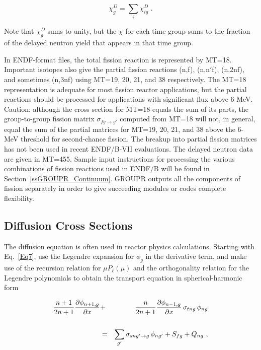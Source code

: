   \begin{equation}
    \chi_g^D=\sum_i\chi_{ig}^D\,\,.
  \end{equation}

\noindent
Note that $\chi_g^D$ sums to unity, but the $\chi$ for each time group
sums to the fraction of the delayed neutron yield that appears
in that time group.

In ENDF-format files, the total fission reaction is represented
by MT=18.  Important isotopes also give the partial fission reactions
 (n,f), (n,n$'$f), (n,2nf), and sometimes (n,3nf)
using MT=19, 20, 21, and 38 respectively.  The MT=18 representation is
adequate for most fission reactor applications, but the partial reactions
should be processed for applications with significant flux above 6 MeV.
Caution:  although the cross section for MT=18 equals the sum of its
parts, the group-to-group fission matrix $\sigma_{fg\rightarrow g'}$
computed from MT=18 will not, in general, equal the sum of the
partial matrices for MT=19, 20, 21, and 38 above the 6-MeV threshold
for second-chance fission.  The breakup into partial fission matrices
has not been used in recent ENDF/B-VII evaluations.  The
delayed neutron data are given in MT=455.  Sample input instructions
for processing the various combinations of fission reactions used
in ENDF/B will be found in Section~\ref{ssGROUPR_Continuum}.  GROUPR outputs all
the components of fission separately in order to give succeeding
modules or codes complete flexibility.

\subsection{Diffusion Cross Sections}
\label{ssGROUPR_Diffusion}

The diffusion equation is often used in reactor physics
calculations.  Starting with
Eq.~\ref{Eq7}, use the Legendre expansion
for $\phi_g$ in the derivative term, and make use of the recursion
relation for $\mu P_{\ell}(\mu)$ and the orthogonality relation for
the Legendre polynomials to obtain the transport equation in
spherical-harmonic form

  \begin{eqnarray}
    {{n+1}\over{2n+1}}{{\partial\phi_{n+1,g}}\over{\partial x}}
    &+&{{n}\over{2n+1}}{{\partial\phi_{n-1,g}}\over{\partial x}}
    \,\sigma_{tng}\,\phi_{ng}\nonumber\\
    \mbox{ }\nonumber\\
    &=& \sum_{g'}\sigma_{sng'\rightarrow g}\,\phi_{ng'}+S_{fg}+Q_{ng}\,\,,
  \end{eqnarray}

